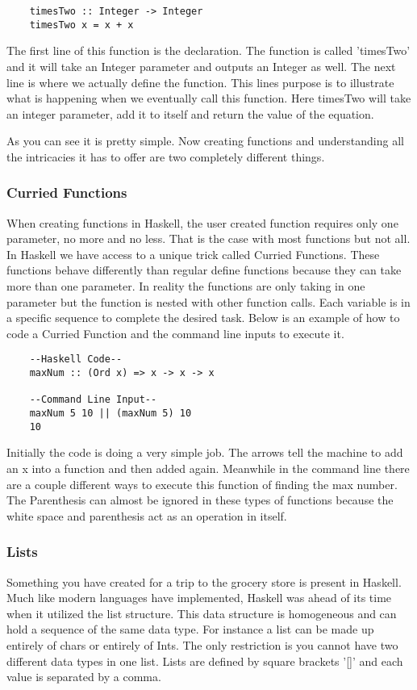 \documentclass{article}
\begin{document}
    \begin{lstlisting}
    timesTwo :: Integer -> Integer
    timesTwo x = x + x 
    \end{lstlisting}
    
    \medskip
    The first line of this function is the declaration. The function is called 'timesTwo' and it will take an Integer parameter and outputs an Integer as well. The next line is where we actually define the function. This lines purpose is to illustrate what is happening when we eventually call this function. Here timesTwo will take an integer parameter, add it to itself and return the value of the equation. 
    
    \medskip
    As you can see it is pretty simple. Now creating functions and understanding all the intricacies it has to offer are two completely different things. 
    
    \subsubsection{Curried Functions}
    When creating functions in Haskell, the user created function requires only one parameter, no more and no less. That is the case with most functions but not all. In Haskell we have access to a unique trick called Curried Functions. These functions behave differently than regular define functions because they can take more than one parameter. In reality the functions are only taking in one parameter but the function is nested with other function calls. Each variable is in a specific sequence to complete the desired task. Below is an example of how to code a Curried Function and the command line inputs to execute it. 
    
    \begin{lstlisting}
    --Haskell Code--
    maxNum :: (Ord x) => x -> x -> x 
    
    --Command Line Input--
    maxNum 5 10 || (maxNum 5) 10
    10
    \end{lstlisting}
    
    Initially the code is doing a very simple job. The arrows tell the machine to add an x into a function and then added again. Meanwhile in the command line there are a couple different ways to execute this function of finding the max number. The Parenthesis can almost be ignored in these types of functions because the white space and parenthesis act as an operation in itself.
    
    \subsubsection{Lists}
    Something you have created for a trip to the grocery store is present in Haskell. Much like modern languages have implemented, Haskell was ahead of its time when it utilized the list structure. This data structure is homogeneous and can hold a sequence of the same data type. For instance a list can be made up entirely of chars or entirely of Ints. The only restriction is you cannot have two different data types in one list. Lists are defined by square brackets '[]' and each value is separated by a comma. 
    
\end{document}
